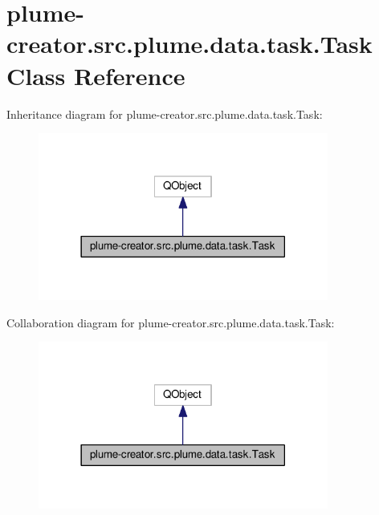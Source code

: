 \hypertarget{classplume-creator_1_1src_1_1plume_1_1data_1_1task_1_1_task}{}\section{plume-\/creator.src.\+plume.\+data.\+task.\+Task Class Reference}
\label{classplume-creator_1_1src_1_1plume_1_1data_1_1task_1_1_task}


Inheritance diagram for plume-\/creator.src.\+plume.\+data.\+task.\+Task\+:\nopagebreak
\begin{figure}[H]
\begin{center}
\leavevmode
\includegraphics[width=270pt]{classplume-creator_1_1src_1_1plume_1_1data_1_1task_1_1_task__inherit__graph}
\end{center}
\end{figure}


Collaboration diagram for plume-\/creator.src.\+plume.\+data.\+task.\+Task\+:\nopagebreak
\begin{figure}[H]
\begin{center}
\leavevmode
\includegraphics[width=270pt]{classplume-creator_1_1src_1_1plume_1_1data_1_1task_1_1_task__coll__graph}
\end{center}
\end{figure}
